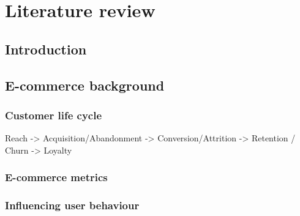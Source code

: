 \chapter{Literature review} \label{chap:sota}

\section*{}



\section{Introduction}



\section{E-commerce background}

\subsection{Customer life cycle}

Reach -> Acquisition/Abandonment -> Conversion/Attrition -> Retention / Churn -> Loyalty

\subsection{E-commerce metrics}

\cite{Sterne2000}

\subsection{Influencing user behaviour}

